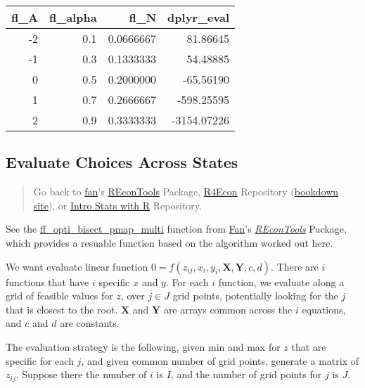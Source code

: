 \documentclass[
]{book}
\begin{document}
\begin{table}[!h]
\centering
\begin{tabular}{r|r|r|r}
\hline
fl\_A & fl\_alpha & fl\_N & dplyr\_eval\\
\hline
\rowcolor{gray!6}  -2 & 0.1 & 0.0666667 & 81.86645\\
\hline
-1 & 0.3 & 0.1333333 & 54.48885\\
\hline
\rowcolor{gray!6}  0 & 0.5 & 0.2000000 & -65.56190\\
\hline
1 & 0.7 & 0.2666667 & -598.25595\\
\hline
\rowcolor{gray!6}  2 & 0.9 & 0.3333333 & -3154.07226\\
\hline
\end{tabular}
\end{table}

\hypertarget{evaluate-choices-across-states}{%
\subsection{Evaluate Choices Across States}\label{evaluate-choices-across-states}}

\begin{quote}
Go back to \href{http://fanwangecon.github.io/}{fan}'s \href{https://fanwangecon.github.io/REconTools/}{REconTools} Package, \href{https://fanwangecon.github.io/R4Econ/}{R4Econ} Repository (\href{https://fanwangecon.github.io/R4Econ/bookdown}{bookdown site}), or \href{https://fanwangecon.github.io/Stat4Econ/}{Intro Stats with R} Repository.
\end{quote}

See the \href{https://fanwangecon.github.io/REconTools/reference/ff_opti_bisect_pmap_multi.html}{ff\_opti\_bisect\_pmap\_multi} function from \href{https://fanwangecon.github.io/}{Fan}'s \emph{\href{https://fanwangecon.github.io/REconTools/}{REconTools}} Package, which provides a resuable function based on the algorithm worked out here.

We want evaluate linear function \(0=f(z_{ij}, x_i, y_i, \textbf{X}, \textbf{Y}, c, d)\). There are \(i\) functions that have \(i\) specific \(x\) and \(y\). For each \(i\) function, we evaluate along a grid of feasible values for \(z\), over \(j\in J\) grid points, potentially looking for the \(j\) that is closest to the root. \(\textbf{X}\) and \(\textbf{Y}\) are arrays common across the \(i\) equations, and \(c\) and \(d\) are constants.

The evaluation strategy is the following, given min and max for \(z\) that are specific for each \(j\), and given common number of grid points, generate a matrix of \(z_{ij}\). Suppose there the number of \(i\) is \(I\), and the number of grid points for \(j\) is \(J\).
\end{document}

